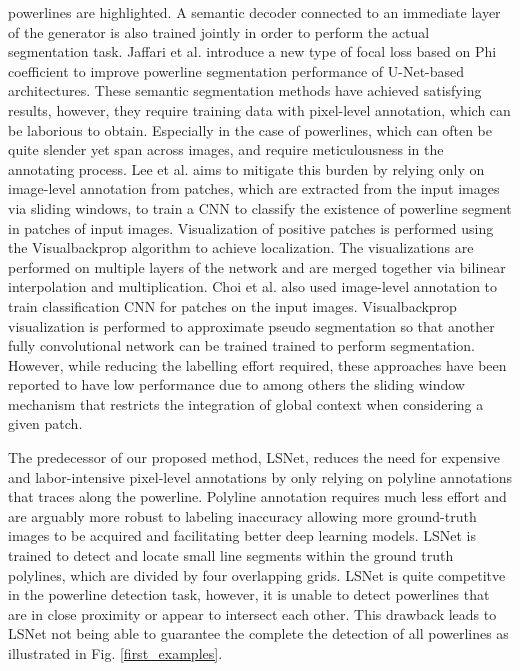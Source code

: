 \documentclass[journal]{IEEEtran}
\begin{document}
powerlines are highlighted. A semantic decoder connected to an immediate layer of the generator is also trained jointly in order to perform the actual segmentation task. Jaffari et al. \cite{related_work_rabeea_haffari_2021} introduce a new type of focal loss based on Phi coefficient \cite{phi_coeff} to improve powerline segmentation performance of U-Net\cite{unet}-based architectures. These semantic segmentation methods have achieved satisfying results, however, they require training data with pixel-level annotation, which can be laborious to obtain.  Especially in the case of powerlines, which can often be quite slender yet span across images, and require meticulousness in the annotating process. Lee et al. \cite{related_work_sang_jun_lee_2017} aims to mitigate this burden by relying only on image-level annotation from patches, which are extracted from the input images via sliding windows, to train a CNN to classify the existence of powerline segment in patches of input images. Visualization of positive patches is performed using the Visualbackprop algorithm \cite{vbp} to achieve localization. The visualizations are performed on multiple layers of the network and are merged together via bilinear interpolation and multiplication. Choi et al. \cite{related_work_hyeyeon_choi_2021} also used image-level annotation to train classification CNN for patches on the input images. Visualbackprop visualization is performed to approximate pseudo segmentation so that another fully convolutional network can be trained trained to perform segmentation. However, while reducing the labelling effort required, these approaches have been reported to have low performance \cite{choi_low_evidence} due to among others the sliding window mechanism that restricts the integration of global context when considering a given patch.

The predecessor of our proposed method, LSNet, reduces the need for expensive and labor-intensive pixel-level annotations by only relying on polyline annotations that traces along the powerline. Polyline annotation requires much less effort and are arguably more robust to labeling inaccuracy allowing more ground-truth images to be acquired and facilitating better deep learning models. LSNet is trained to detect and locate small line segments within the ground truth polylines, which are divided by four overlapping grids. LSNet is quite competitve in the powerline detection task, however, it is unable to detect powerlines that are in close proximity or appear to intersect each other. This drawback leads to LSNet not being able to guarantee the complete the detection of all powerlines as illustrated in Fig. \ref{first_examples}.
\end{document}
